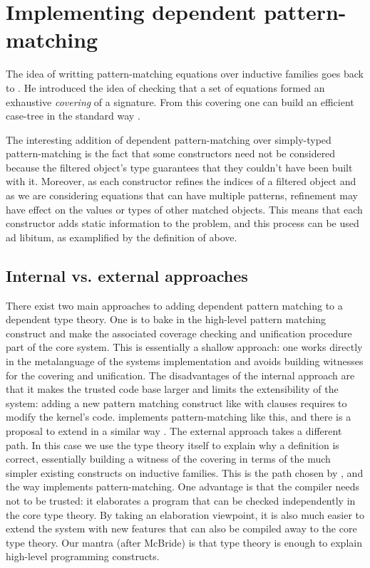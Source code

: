 \section{Implementing dependent pattern-matching}

The idea of writting pattern-matching equations over inductive families
goes back to \cite{coquand92baastad}. He introduced the idea of checking
that a set of equations formed an exhaustive \emph{covering} of a
signature. From this covering one can build an efficient case-tree in
the standard way \cite{DBLP:conf/fpca/Augustsson85}.

The interesting addition of dependent pattern-matching over simply-typed
pattern-matching is the fact that some constructors need not be
considered because the filtered object's type guarantees that they
couldn't have been built with it. Moreover, as each constructor refines
the indices of a filtered object and as we are considering equations
that can have multiple patterns, refinement may have effect on the
values or types of other matched objects. This means that each
constructor adds static information to the problem, and this process 
can be used ad libitum, as examplified by the definition of
 above. 

\subsection{Internal vs. external approaches}

There exist two main approaches to adding dependent pattern matching to
a dependent type theory. One is to bake in the high-level pattern
matching construct and make the associated coverage checking and 
unification procedure part of the core system. This is essentially a
shallow approach: one works directly in the metalanguage of the 
systems implementation and avoids building witnesses for the covering
and unification. The disadvantages of the internal approach are that
it makes the trusted code base larger and limits the extensibility of 
the system: adding a new pattern matching construct like with clauses 
requires to modify the kernel's code. \Agda implements pattern-matching
like this, and there is a proposal to extend \Coq in a similar way
\cite{conf/types/BarrasCGHS08}. 
The external approach takes a different path. In this case we use the 
type theory itself to explain why a definition is correct,
essentially building a witness of the covering in terms of the much
simpler existing constructs on inductive families. This is the path 
chosen by \cite{DBLP:conf/birthday/GoguenMM06}, and the way \Epigram
implements pattern-matching. One advantage is that the compiler needs
not to be trusted: it elaborates a program that can be checked
independently in the core type theory. By taking an elaboration
viewpoint, it is also much easier to extend the system with new features
that can also be compiled away to the core type theory. Our 
mantra (after McBride) is that type theory is enough to explain
high-level programming constructs. 

